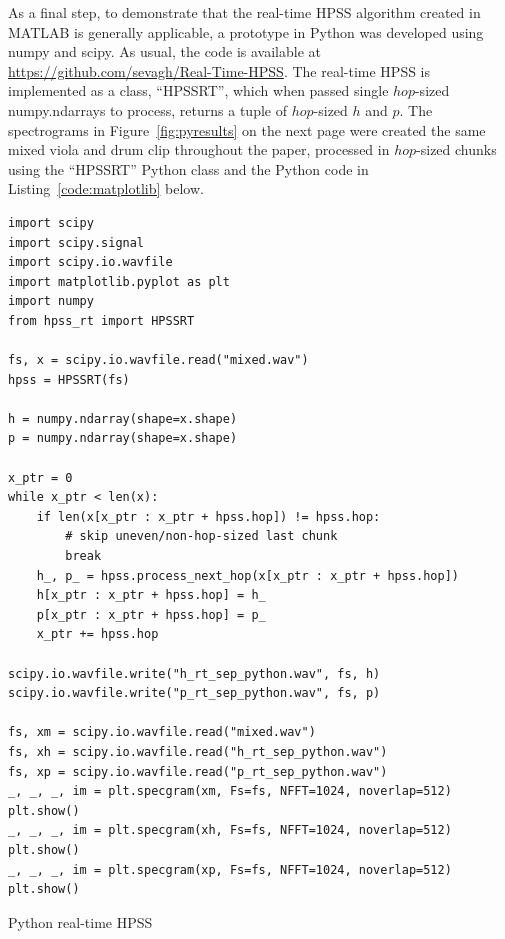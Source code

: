 \documentclass[letter,12pt]{article}
\begin{document}
As a final step, to demonstrate that the real-time HPSS algorithm created in MATLAB is generally applicable, a prototype in Python was developed using numpy and scipy. As usual, the code is available at \url{https://github.com/sevagh/Real-Time-HPSS}. The real-time HPSS is implemented as a class, ``HPSSRT'', which when passed single $hop$-sized numpy.ndarrays to process, returns a tuple of $hop$-sized $h$ and $p$. The spectrograms in Figure~\ref{fig:pyresults} on the next page were created the same mixed viola and drum clip throughout the paper, processed in $hop$-sized chunks using the ``HPSSRT'' Python class and the Python code in Listing~\ref{code:matplotlib} below.

\begin{listing}[h]
\setlength\partopsep{-\topsep}
\begin{verbatim}
import scipy
import scipy.signal
import scipy.io.wavfile
import matplotlib.pyplot as plt
import numpy
from hpss_rt import HPSSRT

fs, x = scipy.io.wavfile.read("mixed.wav")
hpss = HPSSRT(fs)

h = numpy.ndarray(shape=x.shape)
p = numpy.ndarray(shape=x.shape)

x_ptr = 0
while x_ptr < len(x):
    if len(x[x_ptr : x_ptr + hpss.hop]) != hpss.hop:
        # skip uneven/non-hop-sized last chunk
        break
    h_, p_ = hpss.process_next_hop(x[x_ptr : x_ptr + hpss.hop])
    h[x_ptr : x_ptr + hpss.hop] = h_
    p[x_ptr : x_ptr + hpss.hop] = p_
    x_ptr += hpss.hop

scipy.io.wavfile.write("h_rt_sep_python.wav", fs, h)
scipy.io.wavfile.write("p_rt_sep_python.wav", fs, p)

fs, xm = scipy.io.wavfile.read("mixed.wav")
fs, xh = scipy.io.wavfile.read("h_rt_sep_python.wav")
fs, xp = scipy.io.wavfile.read("p_rt_sep_python.wav")
_, _, _, im = plt.specgram(xm, Fs=fs, NFFT=1024, noverlap=512)
plt.show()
_, _, _, im = plt.specgram(xh, Fs=fs, NFFT=1024, noverlap=512)
plt.show()
_, _, _, im = plt.specgram(xp, Fs=fs, NFFT=1024, noverlap=512)
plt.show()
\end{verbatim}
\caption{Python real-time HPSS}
\label{code:matplotlib}
\end{listing}

\vfill
\clearpage %
\end{document}
